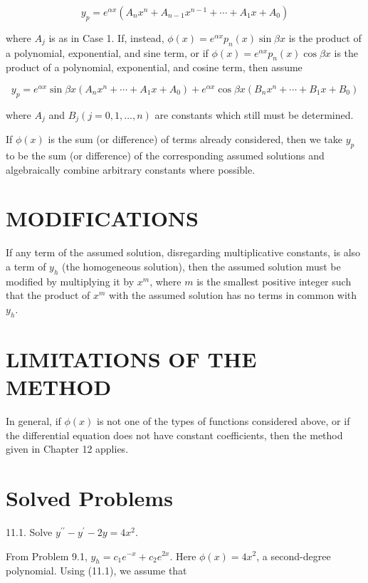 \documentclass[10pt]{article}
\begin{document}
\begin{equation*}
y_{p}=e^{\alpha x}\left(A_{n} x^{n}+A_{n-1} x^{n-1}+\cdots+A_{1} x+A_{0}\right) \tag{11.4}
\end{equation*}


where $A_{j}$ is as in Case 1. If, instead, $\phi(x)=e^{\alpha x} p_{n}(x) \sin \beta x$ is the product of a polynomial, exponential, and sine term, or if $\phi(x)=e^{\alpha x} p_{n}(x) \cos \beta x$ is the product of a polynomial, exponential, and cosine term, then assume


\begin{equation*}
y_{p}=e^{\alpha x} \sin \beta x\left(A_{n} x^{n}+\cdots+A_{1} x+A_{0}\right)+e^{\alpha x} \cos \beta x\left(B_{n} x^{n}+\cdots+B_{1} x+B_{0}\right) \tag{11.5}
\end{equation*}


where $A_{j}$ and $B_{j}(j=0,1, \ldots, n)$ are constants which still must be determined.

If $\phi(x)$ is the sum (or difference) of terms already considered, then we take $y_{p}$ to be the sum (or difference) of the corresponding assumed solutions and algebraically combine arbitrary constants where possible.

\section*{MODIFICATIONS}
If any term of the assumed solution, disregarding multiplicative constants, is also a term of $y_{h}$ (the homogeneous solution), then the assumed solution must be modified by multiplying it by $x^{m}$, where $m$ is the smallest positive integer such that the product of $x^{m}$ with the assumed solution has no terms in common with $y_{h}$.

\section*{LIMITATIONS OF THE METHOD}
In general, if $\phi(x)$ is not one of the types of functions considered above, or if the differential equation does not have constant coefficients, then the method given in Chapter 12 applies.

\section*{Solved Problems}
11.1. Solve $y^{\prime \prime}-y^{\prime}-2 y=4 x^{2}$.

From Problem 9.1, $y_{h}=c_{1} e^{-x}+c_{2} e^{2 x}$. Here $\phi(x)=4 x^{2}$, a second-degree polynomial. Using (11.1), we assume that
\end{document}
